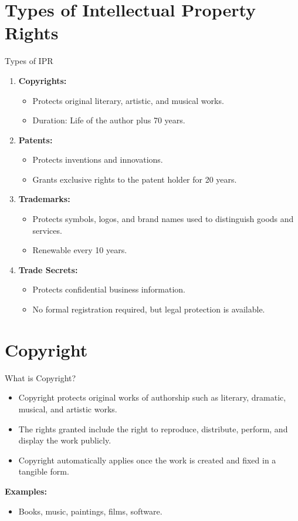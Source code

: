 \documentclass{beamer}
\begin{document}
	\section{Types of Intellectual Property Rights}
	\begin{frame}{Types of IPR}
		\begin{enumerate}
			\item \textbf{Copyrights:}
			\begin{itemize}
				\item Protects original literary, artistic, and musical works.
				\item Duration: Life of the author plus 70 years.
			\end{itemize}
			\item \textbf{Patents:}
			\begin{itemize}
				\item Protects inventions and innovations.
				\item Grants exclusive rights to the patent holder for 20 years.
			\end{itemize}
			\item \textbf{Trademarks:}
			\begin{itemize}
				\item Protects symbols, logos, and brand names used to distinguish goods and services.
				\item Renewable every 10 years.
			\end{itemize}
			\item \textbf{Trade Secrets:}
			\begin{itemize}
				\item Protects confidential business information.
				\item No formal registration required, but legal protection is available.
			\end{itemize}
		\end{enumerate}
	\end{frame}
	
	\section{Copyright}
	\begin{frame}{What is Copyright?}
		\begin{itemize}
			\item Copyright protects original works of authorship such as literary, dramatic, musical, and artistic works.
			\item The rights granted include the right to reproduce, distribute, perform, and display the work publicly.
			\item Copyright automatically applies once the work is created and fixed in a tangible form.
		\end{itemize}
		\vspace{0.5cm}
		\textbf{Examples:}
		\begin{itemize}
			\item Books, music, paintings, films, software.
		\end{itemize}
	\end{frame}
	
\end{document}
